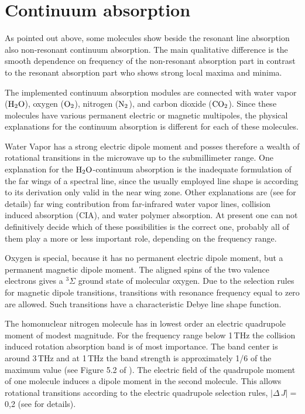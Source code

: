 
\section{Continuum absorption}
\label{sec:abs_theory:ContAbs}

As pointed out above, some molecules show beside the resonant line
absorption also non-resonant continuum absorption. The main qualitative
difference is the smooth dependence on frequency of the non-resonant
absorption part in contrast to the resonant absorption part who shows 
strong local maxima and minima.

The implemented continuum absorption modules are connected with water
vapor ($\mbox{H}_2\mbox{O}$), oxygen ($\mbox{O}_2$), nitrogen ($\mbox{N}_2$), and carbon dioxide
($\mbox{CO}_2$). Since these molecules have various permanent electric or magnetic
multipoles, the physical explanations for the continuum absorption is 
different for each of these molecules.

Water Vapor has a strong electric dipole moment and posses therefore a 
wealth of rotational transitions in the microwave up to the submillimeter 
range. One explanation for the $\mbox{H}_2\mbox{O}$-continuum absorption is the inadequate 
formulation of the far wings of a spectral line, since the usually employed 
\citet{vanvleck:45} line shape is according to its derivation only valid 
in the near wing zone. Other explanations are (see \citet{pwr:93} for details) 
far wing contribution from far-infrared water vapor lines, collision induced 
absorption (CIA), and water polymer absorption. At present one can not definitively 
decide which of these possibilities is the correct one, probably all of them 
play a more or less important role, depending on the frequency range.

Oxygen is special, because it has no permanent electric dipole moment,
but a permanent magnetic dipole moment. The aligned spins of the two
valence electrons gives a $^{3}\Sigma$ ground state of molecular
oxygen.  Due to the selection rules for magnetic dipole transitions,
transitions with resonance frequency equal to zero are allowed. Such
transitions have a characteristic Debye line shape function.

The homonuclear nitrogen molecule has in lowest order an electric quadrupole moment 
of modest magnitude.
For the frequency range below 1\,THz the collision induced rotation absorption 
band \citep{goodyandyung:89} is of most importance. The band center is around 3\,THz and 
at 1\,THz the band strength is approximately 1/6 of the maximum value (see 
Figure 5.2 of \citet{goodyandyung:89}). The electric field of the quadrupole 
moment of one molecule induces a dipole moment in the second molecule. This allows 
rotational transitions according to the electric quadrupole selection rules, 
$|\Delta\,J|=$0,2 (see \citet{pwr:93} for details). 

